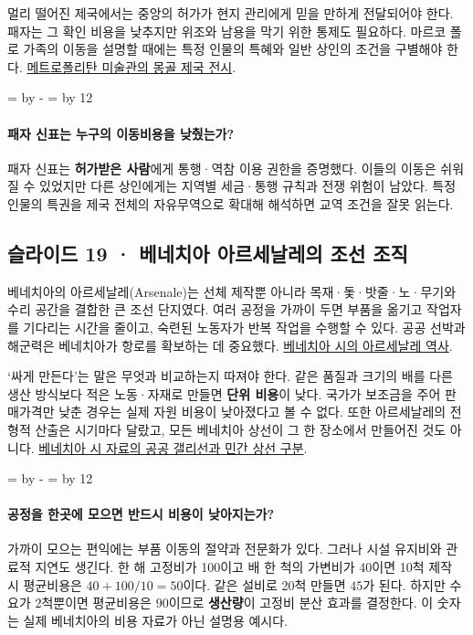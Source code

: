 \documentclass[10pt,a4paper]{article}
\newcommand{\ReserveQuestionSpace}{%
  \par\begingroup
  \dimen0=\pagegoal \advance\dimen0 by -\pagetotal
  \dimen2=\baselineskip \multiply\dimen2 by 12
  \ifdim\dimen0<\dimen2 \newpage\fi
  \endgroup}
\begin{document}
멀리 떨어진 제국에서는 중앙의 허가가 현지 관리에게 믿을 만하게 전달되어야 한다. 패자는 그 확인 비용을 낮추지만 위조와 남용을 막기 위한 통제도 필요하다. 마르코 폴로 가족의 이동을 설명할 때에는 특정 인물의 특혜와 일반 상인의 조건을 구별해야 한다. \href{https://www.metmuseum.org/exhibitions/listings/2010/khubilai-khan}{메트로폴리탄 미술관의 몽골 제국 전시}.\par

\ReserveQuestionSpace
\paragraph{패자 신표는 누구의 이동비용을 낮췄는가?}
패자 신표는 \textbf{허가받은 사람}에게 통행·역참 이용 권한을 증명했다. 이들의 이동은 쉬워질 수 있었지만 다른 상인에게는 지역별 세금·통행 규칙과 전쟁 위험이 남았다. 특정 인물의 특권을 제국 전체의 자유무역으로 확대해 해석하면 교역 조건을 잘못 읽는다.\par

\subsection{슬라이드 19 · 베네치아 아르세날레의 조선 조직}
베네치아의 아르세날레(Arsenale)는 선체 제작뿐 아니라 목재·돛·밧줄·노·무기와 수리 공간을 결합한 큰 조선 단지였다. 여러 공정을 가까이 두면 부품을 옮기고 작업자를 기다리는 시간을 줄이고, 숙련된 노동자가 반복 작업을 수행할 수 있다. 공공 선박과 해군력은 베네치아가 항로를 확보하는 데 중요했다. \href{https://www.comune.venezia.it/it/content/storia-dellarsenale-venezia}{베네치아 시의 아르세날레 역사}.\par

‘싸게 만든다’는 말은 무엇과 비교하는지 따져야 한다. 같은 품질과 크기의 배를 다른 생산 방식보다 적은 노동·자재로 만들면 \textbf{단위 비용}이 낮다. 국가가 보조금을 주어 판매가격만 낮춘 경우는 실제 자원 비용이 낮아졌다고 볼 수 없다. 또한 아르세날레의 전형적 산출은 시기마다 달랐고, 모든 베네치아 상선이 그 한 장소에서 만들어진 것도 아니다. \href{https://www.comune.venezia.it/ar/node/11174}{베네치아 시 자료의 공공 갤리선과 민간 상선 구분}.\par

\ReserveQuestionSpace
\paragraph{공정을 한곳에 모으면 반드시 비용이 낮아지는가?}
가까이 모으는 편익에는 부품 이동의 절약과 전문화가 있다. 그러나 시설 유지비와 관료적 지연도 생긴다. 한 해 고정비가 100이고 배 한 척의 가변비가 40이면 10척 제작 시 평균비용은 $40+100/10=50$이다. 같은 설비로 20척 만들면 $45$가 된다. 하지만 수요가 2척뿐이면 평균비용은 $90$이므로 \textbf{생산량}이 고정비 분산 효과를 결정한다. 이 숫자는 실제 베네치아의 비용 자료가 아닌 설명용 예시다.\par
\end{document}
